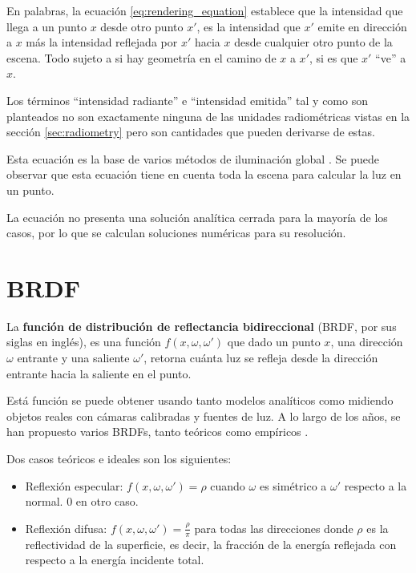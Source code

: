 En palabras, la ecuación \ref{eq:rendering_equation} establece que la intensidad que llega a un punto $x$ desde otro punto $x'$, es la intensidad que $x'$ emite en dirección a $x$ más la intensidad reflejada por $x'$ hacia $x$ desde cualquier otro punto de la escena.
Todo sujeto a si hay geometría en el camino de $x$ a $x'$, si es que $x'$ ``ve'' a $x$.

Los términos ``intensidad radiante'' e ``intensidad emitida'' tal y como son planteados no son exactamente ninguna de las unidades radiométricas vistas en la sección \ref{sec:radiometry} pero son cantidades que pueden derivarse de estas.

Esta ecuación es la base de varios métodos de iluminación global \cite{rtr}.
Se puede observar que esta ecuación tiene en cuenta toda la escena para calcular la luz en un punto.

La ecuación no presenta una solución analítica cerrada para la mayoría de los casos, por lo que se calculan soluciones numéricas para su resolución.

\section{BRDF}\label{sec:brdf}

La \textbf{función de distribución de reflectancia bidireccional} (BRDF, por sus siglas en inglés), es una función $f(x, \omega, \omega')$ que dado un punto $x$, una dirección $\omega$ entrante y una saliente $\omega'$, retorna cuánta luz se refleja desde la dirección entrante hacia la saliente en el punto.

Está función se puede obtener usando tanto modelos analíticos como midiendo objetos reales con cámaras calibradas y fuentes de luz.
A lo largo de los años, se han propuesto varios BRDFs, tanto teóricos como empíricos \cite{review-of-brdf-models}.


Dos casos teóricos e ideales son los siguientes:

\begin{itemize}
    \item Reflexión especular: $f(x, \omega, \omega') = \rho$ cuando $\omega$ es simétrico a $\omega'$ respecto a la normal. $0$ en otro caso.
    \item Reflexión difusa: $f(x, \omega, \omega') = \frac{\rho}{\pi}$ para todas las direcciones donde $\rho$ es la reflectividad de la superficie, es decir, la fracción de la energía reflejada con respecto a la energía incidente total.
\end{itemize}

